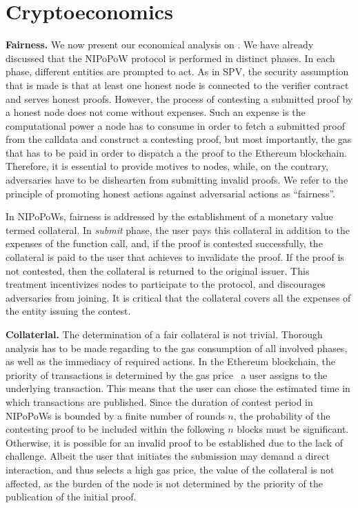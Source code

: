 \section{Cryptoeconomics}

\textbf{Fairness.} We now present our economical analysis on \name. We have
already discussed that the NIPoPoW protocol is performed in distinct phases. In
each phase, different entities are prompted to act. As in SPV, the security
assumption that is made is that at least one honest node is connected to the
verifier contract and serves honest proofs. However, the process of contesting
a submitted proof by a honest node does not come without expenses.  Such an
expense is the computational power a node has to consume in order to fetch a
submitted proof from the calldata and construct a contesting proof, but most
importantly, the gas that has to be paid in order to dispatch a the proof to
the Ethereum blockchain. Therefore, it is essential to provide motives to
nodes, while, on the contrary, adversaries have to be dishearten from
submitting invalid proofs.  We refer to the principle of promoting honest
actions against adversarial actions as ``fairness''.

In NIPoPoWs, fairness is addressed by the establishment of a monetary value
termed collateral. In \emph{submit} phase, the user pays this collateral in
addition to the expenses of the function call, and, if the proof is contested
successfully, the collateral is paid to the user that achieves to invalidate
the proof. If the proof is not contested, then the collateral is returned to
the original issuer. This treatment incentivizes nodes to participate to the
protocol, and discourages adversaries from joining. It is critical that the
collateral covers all the expenses of the entity issuing the contest.

\noindent \textbf{Collaterlal.} The determination of a fair collateral is not
trivial. Thorough analysis has to be made regarding to the gas consumption of
all involved phases, as well as the immediacy of required actions. In the
Ethereum blockchain, the priority of transactions is determined by the gas
price~\cite{wood} a user assigns to the underlying transaction. This means that
the user can chose the estimated time in which transactions are published.
Since the duration of contest period in NIPoPoWs is bounded by a finite number
of rounds $n$, the probability of the contesting proof to be included within the
following $n$ blocks must be significant. Otherwise, it is possible for an invalid
proof to be established due to the lack of challenge. Albeit the user that
initiates the submission may demand a direct interaction, and thus selects a
high gas price, the value of the collateral is not affected, as the burden
of the node is not determined by the priority of the publication of the initial
proof.

